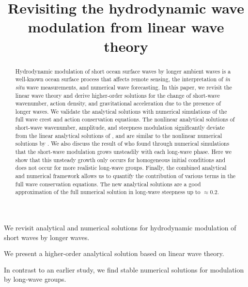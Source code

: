 \documentclass[draft]{agujournal2019}
\begin{document}
\title{Revisiting the hydrodynamic wave modulation from linear wave theory}




\begin{keypoints}
\item We revisit analytical and numerical solutions for hydrodynamic modulation of short waves by longer waves.
\item We present a higher-order analytical solution based on linear wave theory.
\item In contrast to an earlier study, we find stable numerical solutions for modulation by long-wave groups.
\end{keypoints}

\begin{abstract}
Hydrodynamic modulation of short ocean surface waves by longer ambient waves is
a well-known ocean surface process that affects remote sensing, the
interpretation of \textit{in situ} wave measurements, and numerical wave
forecasting.
In this paper, we revisit the linear wave theory and derive higher-order
solutions for the change of short-wave wavenumber, action density, and
gravitational acceleration due to the presence of longer waves.
We validate the analytical solutions with numerical simulations of the full wave
crest and action conservation equations.
The nonlinear analytical solutions of short-wave wavenumber, amplitude, and
steepness modulation significantly deviate from the linear analytical solutions
of , and are similar to the nonlinear numerical
solutions by .
We also discuss the result of  who found through
numerical simulations that the short-wave modulation grows unsteadily with
each long-wave phase.
Here we show that this unsteady growth only occurs for homogeneous initial
conditions and does not occur for more realistic long-wave groups.
Finally, the combined analytical and numerical framework allows us to quantify
the contribution of various terms in the full wave conservation equations.
The new analytical solutions are a good approximation of the full numerical
solution in long-wave steepness up to $\approx 0.2$.
\end{abstract}
\end{document}
